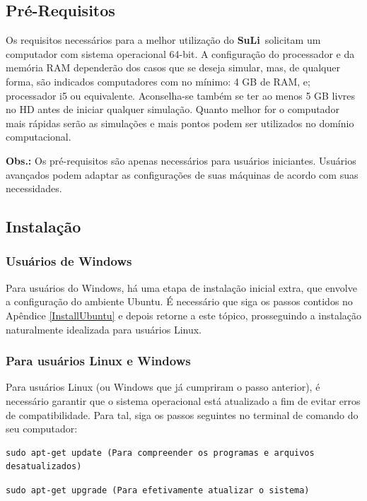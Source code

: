 \documentclass[12pt, a4paper]{article}
\newcommand{\SL}{{\bf SuLi}}
\begin{document}
\subsection{Pré-Requisitos}
Os requisitos necessários para a melhor utilização do \SL\ solicitam um computador com sistema operacional 64-bit. A configuração do processador e da memória RAM dependerão dos casos que se deseja simular, mas, de qualquer forma, são indicados computadores com no mínimo: 4 GB de RAM, e; processador i5 ou equivalente. Aconselha-se também se ter ao menos 5 GB livres no HD antes de iniciar qualquer simulação. Quanto melhor for o computador mais rápidas serão as simulações e mais pontos podem ser utilizados no domínio computacional. 

\textbf{Obs.:} Os pré-requisitos são apenas necessários para usuários iniciantes. Usuários avançados podem adaptar as configurações de suas máquinas de acordo com suas necessidades.

\subsection{Instalação}
\subsubsection{Usuários de Windows}	\label{WindowsUsers}
Para usuários do Windows, há uma etapa de instalação inicial extra, que envolve a configuração do ambiente Ubuntu. É necessário que siga os passos contidos no Apêndice \ref{InstallUbuntu} e depois retorne a este tópico, prosseguindo a instalação naturalmente idealizada para usuários Linux.

\subsubsection{Para usuários Linux e Windows}  \label{ContinueInstall}
Para usuários Linux (ou Windows que já cumpriram o passo anterior), é necessário garantir que o sistema operacional está atualizado a fim de evitar erros de compatibilidade. Para tal, siga os passos seguintes no terminal de comando do seu computador:

\begin{verbatim}
sudo apt-get update (Para compreender os programas e arquivos desatualizados)
\end{verbatim}

\begin{verbatim}
sudo apt-get upgrade (Para efetivamente atualizar o sistema)
\end{verbatim}
\end{document}
